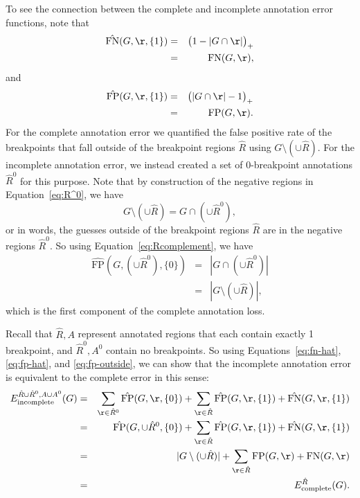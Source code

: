 \documentclass{article}
\begin{document}
To see the connection between the complete and incomplete annotation
error functions, note that
\begin{eqnarray}
\nonumber  \hat{\text{FN}}(G,\r,\{1\}) 
&=&   \big(
1-|G\cap\r|
\big)_+\\
&=&
\text{FN}(G,\r), \label{eq:fn-hat}
\end{eqnarray}
and
\begin{eqnarray}
\nonumber
  \hat{\text{FP}}(G,\r,\{1\}) 
&=&
\big( 
|G\cap\r|-1
\big)_+\\
&=& \text{FP}(G,\r). \label{eq:fp-hat}
\end{eqnarray}
For the complete annotation error we quantified the false positive
rate of the breakpoints that fall outside of the breakpoint regions
$\hat R$ using $G\setminus(\cup \hat R)$. For the incomplete
annotation error, we instead created a set of 0-breakpoint annotations
$\hat R^0$ for this purpose. Note that by construction of the negative
regions in Equation~\ref{eq:R^0}, we have 
\begin{equation}
  \label{eq:Rcomplement}
  G\setminus \left(\cup \hat R\right)
 = 
G\cap\left(\cup \hat R^0 \right),
\end{equation}
or in words, the guesses outside of the breakpoint regions $\hat R$
are in the negative regions $\hat R^0$. So using
Equation~\ref{eq:Rcomplement}, we have
\begin{eqnarray}
  \hat{\text{FP}}(G,(\cup \hat R^0),\{0\})
&=& 
|G\cap(
  \cup \hat R^0
)|\nonumber
\\
&=&
|G\setminus(\cup\hat R)|,\label{eq:fp-outside}
\end{eqnarray}
which is the first component of the complete annotation loss.



Recall that $\hat R,A$ represent annotated regions that each contain
exactly 1 breakpoint, and $\hat R^0,A^0$ contain no breakpoints. So
using Equations~\ref{eq:fn-hat}, \ref{eq:fp-hat}, and
\ref{eq:fp-outside}, we can show that the incomplete annotation error
is equivalent to the complete error in this sense:
\begin{eqnarray}
  E_{\text{incomplete}}^{\hat R\cup \hat R^0,A\cup A^0}(G)
&=&
\sum_{\r\in \hat R^0} \hat{\text{FP}}(G,\r,\{0\})\nonumber 
+
\sum_{\r\in\hat R} \hat{\text{FP}}(G,\r,\{1\}) + \hat{\text{FN}}(G,\r,\{1\})
 \\
&=&
 \hat{\text{FP}}(G,\cup \hat R^0,\{0\})\nonumber 
+
\sum_{\r\in\hat R} \hat{\text{FP}}(G,\r,\{1\}) + \hat{\text{FN}}(G,\r,\{1\})
 \\
&=&
|G\setminus(\cup\hat R)|
+\nonumber
\sum_{\r\in\hat R} {\text{FP}}(G,\r) + {\text{FN}}(G,\r)\\
&=&
E^{\hat R}_{\text{complete}}(G).
\end{eqnarray}
\end{document}
